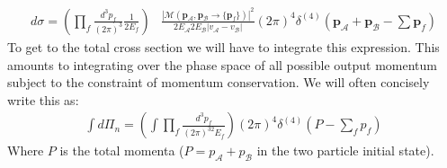 \documentclass[11pt]{article}
\numberwithin{equation}{section}
\begin{document}
\begin{itemize}
     \begin{align}
        d\sigma = \left(\prod_f \frac{d^3p_f}{(2\pi)^3}\frac{1}{2E_f}\right)&\frac{|\mathcal{M}(\textbf{p}_{\mathcal{A}},\textbf{p}_{\mathcal{B}} \rightarrow \{\textbf{p}_f\})|^2}{2E_{\mathcal{A}}2E_{\mathcal{B}}|v_{\mathcal{A}}-v_{\mathcal{B}}|}(2\pi)^4\delta^{(4)}\left(\textbf{p}_{\mathcal{A}}+\textbf{p}_{\mathcal{B}} - \sum \textbf{p}_f\right)
      \end{align} 
      To get to the total cross section we will have to integrate this expression. This amounts to integrating over the phase space of all possible output momentum subject to the constraint of momentum conservation. We will often concisely write this as:
          \begin{align*}
          \int d\Pi_n = \left(\int \prod _f\frac{d^3p_f}{(2\pi)^32E_f}\right)(2\pi)^4\delta^{(4)}(P - \sum_fp_f)
      \end{align*}
      Where $P$ is the total momenta ($P= p_{\mathcal{A}}+p_{\mathcal{B}}$ in the two particle initial state). 
        \end{itemize}
\end{document}
